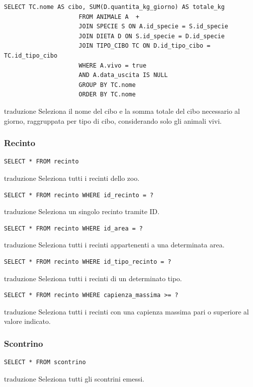 \documentclass[12pt,a4paper]{report}
\begin{document}
\begin{lstlisting}[style=sqlstyle]
SELECT TC.nome AS cibo, SUM(D.quantita_kg_giorno) AS totale_kg
                     FROM ANIMALE A  +
                     JOIN SPECIE S ON A.id_specie = S.id_specie
                     JOIN DIETA D ON S.id_specie = D.id_specie 
                     JOIN TIPO_CIBO TC ON D.id_tipo_cibo = TC.id_tipo_cibo
                     WHERE A.vivo = true
                     AND A.data_uscita IS NULL
                     GROUP BY TC.nome
                     ORDER BY TC.nome
\end{lstlisting}
traduzione {Seleziona il nome del cibo e la somma totale del cibo necessario al giorno, raggruppata per tipo di cibo, considerando solo gli animali vivi.}

\subsubsection*{Recinto}
\begin{lstlisting}[style=sqlstyle]
SELECT * FROM recinto
\end{lstlisting}
traduzione {Seleziona tutti i recinti dello zoo.}

\begin{lstlisting}[style=sqlstyle]
SELECT * FROM recinto WHERE id_recinto = ?
\end{lstlisting}
traduzione {Seleziona un singolo recinto tramite ID.}

\begin{lstlisting}[style=sqlstyle]
SELECT * FROM recinto WHERE id_area = ?
\end{lstlisting}
traduzione {Seleziona tutti i recinti appartenenti a una determinata area.}

\begin{lstlisting}[style=sqlstyle]
SELECT * FROM recinto WHERE id_tipo_recinto = ?
\end{lstlisting}
traduzione {Seleziona tutti i recinti di un determinato tipo.}

\begin{lstlisting}[style=sqlstyle]
SELECT * FROM recinto WHERE capienza_massima >= ?
\end{lstlisting}
traduzione {Seleziona tutti i recinti con una capienza massima pari o superiore al valore indicato.}

\subsubsection*{Scontrino}
\begin{lstlisting}[style=sqlstyle]
SELECT * FROM scontrino
\end{lstlisting}
traduzione {Seleziona tutti gli scontrini emessi.}
\end{document}
